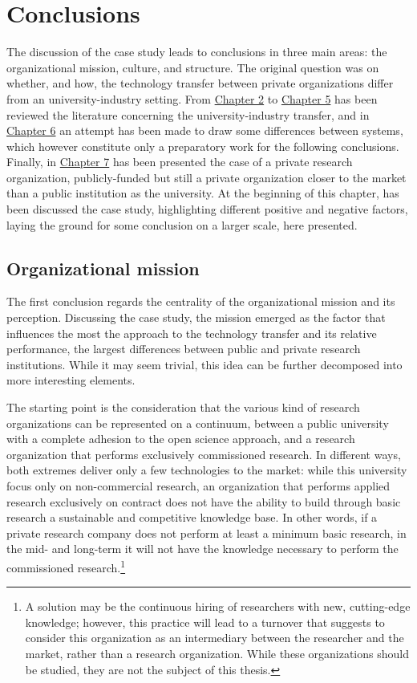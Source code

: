 \section{Conclusions}

The discussion of the case study leads to conclusions in three main areas: the organizational mission, culture, and structure. The original question was on whether, and how, the technology transfer between private organizations differ from an university-industry setting. From \hyperref[Chapter2]{Chapter 2} to \hyperref[Chapter5]{Chapter 5} has been reviewed the literature concerning the university-industry transfer, and in \hyperref[Chapter6]{Chapter 6} an attempt has been made to draw some differences between systems, which however constitute only a preparatory work for the following conclusions. Finally, in \hyperref[Chapter7]{Chapter 7} has been presented the case of a private research organization, publicly-funded but still a private organization closer to the market than a public institution as the university. At the beginning of this chapter, has been discussed the case study, highlighting different positive and negative factors, laying the ground for some conclusion on a larger scale, here presented.

\subsection{Organizational mission}

The first conclusion regards the centrality of the organizational mission and its perception. Discussing the case study, the mission emerged as the factor that influences the most the approach to the technology transfer and its relative performance, the largest differences between public and private research institutions. While it may seem trivial, this idea can be further decomposed into more interesting elements.

The starting point is the consideration that the various kind of research organizations can be represented on a continuum, between a public university with a complete adhesion to the open science approach, and a research organization that performs exclusively commissioned research. In different ways, both extremes deliver only a few technologies to the market: while this university focus only on non-commercial research, an organization that performs applied research exclusively on contract does not have the ability to build through basic research a sustainable and competitive knowledge base. In other words, if a private research company does not perform at least a minimum basic research, in the mid- and long-term it will not have the knowledge necessary to perform the commissioned research.\footnote{A solution may be the continuous hiring of researchers with new, cutting-edge knowledge; however, this practice will lead to a turnover that suggests to consider this organization as an intermediary between the researcher and the market, rather than a research organization. While these organizations should be studied, they are not the subject of this thesis.}

